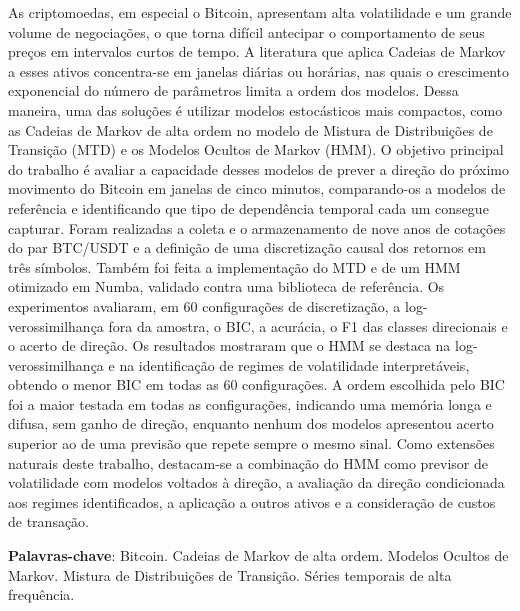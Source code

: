 \documentclass[
    12pt,                %
    openright,           %
    oneside,             %
    a4paper,             %
    english,             %
    brazil               %
]{abntex2}
\begin{document}
\begin{resumo}
As criptomoedas, em especial o Bitcoin, apresentam alta volatilidade e um grande volume de negociações, 
o que torna difícil antecipar o comportamento de seus preços em intervalos curtos de tempo. 
A literatura que aplica Cadeias de Markov a esses ativos concentra-se em janelas diárias ou horárias, nas quais o 
crescimento exponencial do número de parâmetros limita a ordem dos modelos. 
Dessa maneira, uma das soluções é utilizar modelos estocásticos mais compactos, como as 
Cadeias de Markov de alta ordem no modelo de Mistura de Distribuições de Transição (MTD) e os Modelos Ocultos de Markov (HMM). 
O objetivo principal do trabalho é avaliar a capacidade desses modelos de prever a direção do próximo movimento do Bitcoin em 
janelas de cinco minutos, comparando-os a modelos de referência e identificando que tipo de dependência temporal cada um consegue 
capturar. Foram realizadas a coleta e o armazenamento de nove anos de cotações do par BTC/USDT e a definição de uma 
discretização causal dos retornos em três símbolos. Também foi feita a implementação do MTD e de um HMM otimizado em Numba, 
validado contra uma biblioteca de referência. Os experimentos avaliaram, em 60 configurações de discretização, a log-verossimilhança fora da amostra, 
o BIC, a acurácia, o F1 das classes direcionais e o acerto de direção. Os resultados 
mostraram que o HMM se destaca na log-verossimilhança e na identificação de regimes de volatilidade interpretáveis, obtendo o menor BIC em todas as 60 configurações. 
A ordem escolhida pelo BIC foi a maior testada em todas as configurações, indicando uma memória longa e difusa, sem ganho de direção, 
enquanto nenhum dos modelos apresentou acerto superior ao de uma previsão que repete sempre o mesmo sinal. Como extensões naturais deste trabalho, 
destacam-se a combinação do HMM como previsor de volatilidade com modelos voltados à direção, a avaliação da direção condicionada 
aos regimes identificados, a aplicação a outros ativos e a consideração de custos de transação.

\vspace{\onelineskip}

\noindent
\textbf{Palavras-chave}: Bitcoin. Cadeias de Markov de alta ordem. Modelos Ocultos de Markov. Mistura de Distribuições de Transição. Séries temporais de alta frequência.
\end{resumo}
\end{document}
